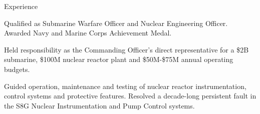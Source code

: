 \begin{rubric}{Experience}
\begin{list2}
\end{list2}
\entry*[12/2006 \-- 06/2009] 
\begin{list2}
	\item Qualified as Submarine Warfare Officer and Nuclear Engineering Officer. Awarded Navy and Marine Corps Achievement Medal.
	\item Held responsibility as the Commanding Officer's direct representative for a \$2B submarine, \$100M nuclear reactor plant and \$50M-\$75M annual operating budgets.
	\item Guided operation, maintenance and testing of nuclear reactor instrumentation, control systems and protective features. Resolved a decade-long persistent fault in the S8G Nuclear Instrumentation and Pump Control systems.
\end{list2}
\end{rubric}

